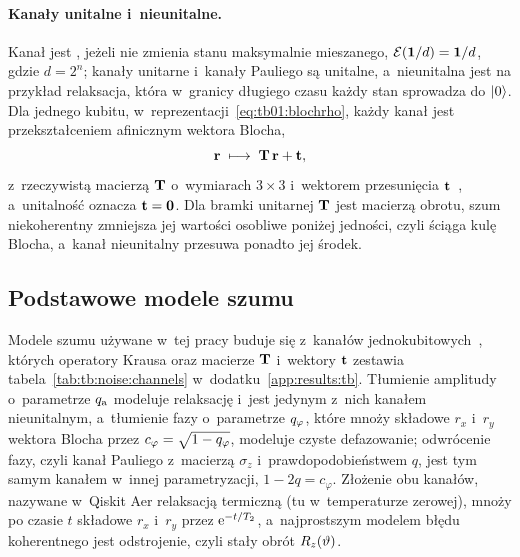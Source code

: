 \paragraph{Kanały unitalne i~nieunitalne.}
Kanał jest , jeżeli nie zmienia stanu maksymalnie mieszanego, $\mathcal{E}(\mathbf{1}/d)=\mathbf{1}/d$, gdzie $d=2^n$; kanały unitarne i~kanały Pauliego są unitalne, a~nieunitalna jest na przykład relaksacja, która w~granicy długiego czasu każdy stan sprowadza do $\ket{0}$.
Dla jednego kubitu, w~reprezentacji~\eqref{eq:tb01:blochrho}, każdy kanał jest przekształceniem afinicznym wektora Blocha,
\begin{equation}\label{eq:tb:noise:affine}
\mathbf{r}\;\longmapsto\;\mathbf{T}\,\mathbf{r}+\mathbf{t},
\end{equation}
z~rzeczywistą macierzą $\mathbf{T}$ o~wymiarach $3\times3$ i~wektorem przesunięcia $\mathbf{t}$~\cite{NielsenChuang2010}, a~unitalność oznacza $\mathbf{t}=\mathbf{0}$.
Dla bramki unitarnej $\mathbf{T}$ jest macierzą obrotu, szum niekoherentny zmniejsza jej wartości osobliwe poniżej jedności, czyli ściąga kulę Blocha, a~kanał nieunitalny przesuwa ponadto jej środek.

\subsection{Podstawowe modele szumu}\label{subsec:tb:noise:models}

Modele szumu używane w~tej pracy buduje się z~kanałów jednokubitowych~\cite{NielsenChuang2010}, których operatory Krausa oraz macierze $\mathbf{T}$ i~wektory $\mathbf{t}$ zestawia tabela~\ref{tab:tb:noise:channels} w~dodatku~\ref{app:results:tb}.
Tłumienie amplitudy o~parametrze $q_{\mathrm{a}}$ modeluje relaksację i~jest jedynym z~nich kanałem nieunitalnym, a~tłumienie fazy o~parametrze $q_{\varphi}$, które mnoży składowe $r_x$ i~$r_y$ wektora Blocha przez $c_{\varphi}=\sqrt{1-q_{\varphi}}$, modeluje czyste defazowanie; odwrócenie fazy, czyli kanał Pauliego z~macierzą $\sigma_z$ i~prawdopodobieństwem $q$, jest tym samym kanałem w~innej parametryzacji, $1-2q=c_{\varphi}$.
Złożenie obu kanałów, nazywane w~Qiskit Aer relaksacją termiczną (tu w~temperaturze zerowej), mnoży po czasie $t$ składowe $r_x$ i~$r_y$ przez $\mathrm{e}^{-t/T_2}$, a~najprostszym modelem błędu koherentnego jest odstrojenie, czyli stały obrót $R_z(\vartheta)$.

